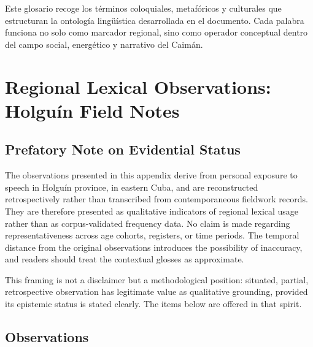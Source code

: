\documentclass[12pt]{article}
\begin{document}
\bigskip

Este glosario recoge los términos coloquiales, metafóricos y culturales que estructuran la ontología lingüística desarrollada en el documento. Cada palabra funciona no solo como marcador regional, sino como operador conceptual dentro del campo social, energético y narrativo del Caimán.

\section{Regional Lexical Observations: Holguín Field Notes}
\label{app:holguin}

\subsection*{Prefatory Note on Evidential Status}

The observations presented in this appendix derive from personal exposure to speech in Holguín province, in eastern Cuba, and are reconstructed retrospectively rather than transcribed from contemporaneous fieldwork records. They are therefore presented as qualitative indicators of regional lexical usage rather than as corpus-validated frequency data. No claim is made regarding representativeness across age cohorts, registers, or time periods. The temporal distance from the original observations introduces the possibility of inaccuracy, and readers should treat the contextual glosses as approximate.

This framing is not a disclaimer but a methodological position: situated, partial, retrospective observation has legitimate value as qualitative grounding, provided its epistemic status is stated clearly. The items below are offered in that spirit.

\subsection*{Observations}
\end{document}
